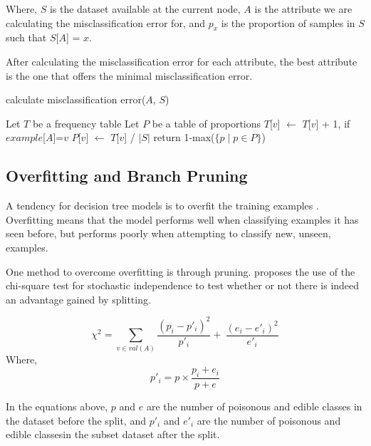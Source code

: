 \documentclass{IEEEtran}
\begin{document}
Where, $S$ is the dataset available at the current node, $A$ is the
attribute we are calculating the misclassification error for, and $p_x$
is the proportion of samples in $S$ such that $S$[$A$] = $x$.

After calculating the misclassification error for each attribute, the
best attribute is the one that offers the minimal misclassification
error.

\begin{algorithm}
\caption{calculate misclassification error($A$, $S$)}
\begin{algorithmic}
\Statex {}
\State Let $T$ be a frequency table
\State Let $P$ be a table of proportions
    \State $T$[$v$] $\leftarrow$ $T$[$v$] + 1, if $example$[$A$]=$v$
  \EndFor
  \State $P$[$v$] $\leftarrow$ $T$[$v$] / $\lvert S \rvert$
\EndFor
\State return 1-max($\lbrace p \mid p \in P\rbrace$)

\end{algorithmic}
\end{algorithm}

\subsection{Overfitting and Branch Pruning}
A tendency for decision tree models is to overfit the training
examples \parencite{mitchell1997machine}. Overfitting means that the
model performs well when classifying examples it has seen before, but
performs poorly when attempting to classify new, unseen, examples.

One method to overcome overfitting is through
pruning. \parencite{quinlan1986induction} proposes the use of the
chi-square test for stochastic independence to test whether or not
there is indeed an advantage gained by splitting.

\begin{equation}
\label{chi-square-equation}
\chi^2 = \sum_{v\in val(A)}\frac{(p_i-p'_i)^2}{p'_i} + \
\frac{(e_i-e'_i)^2}{e'_i}
\end{equation}
Where,
\begin{equation}
\label{chi-square-helper-equation}
p'_i = p \times \frac{p_i+e_i}{p+e}
\end{equation}

In the equations above, $p$ and $e$ are the number of poisonous and
edible classes in the dataset before the split, and $p'_i$ and $e'_i$
are the number of poisonous and edible classesin the subset dataset
after the split. 
\end{document}
